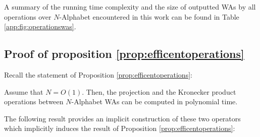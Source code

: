     A summary of the running time complexity and the size of outputted WAs by all operations over $N$-Alphabet encountered in this work can be found in Table \ref{app:fig:operationswas}. 

\subsection{Proof of proposition \ref{prop:efficentoperations}}
Recall the statement of Proposition \ref{prop:efficentoperations}:

\begin{unumberedproposition}
       Assume that $N = O(1)$. Then, the projection and the Kronecker product operations between $N$-Alphabet WAs can be computed in polynomial time.
\end{unumberedproposition}
 The following result provides an implicit construction of these two operators which implicitly induces the result of Proposition \ref{prop:efficentoperations}: 

